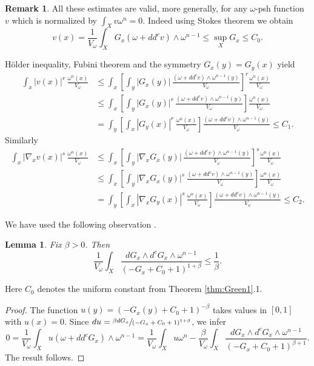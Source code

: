 \documentclass[10pt]{amsart}
\newtheorem{lem}[theorem]{Lemma}
\theoremstyle{definition}
\newtheorem{rem}[theorem]{Remark}
\begin{document}
\begin{rem}
All these estimates are valid, more generally, for any $\omega$-psh function~$v$ which is
normalized by $\int_X v \omega^n=0$. Indeed using Stokes theorem we obtain
\[
v(x) =\frac{1}{V_{\omega}} \int_X G_x (\omega+dd^c v) \wedge \omega^{n-1} \leq \sup_X G_x \leq C_0.
\]

Hölder inequality, Fubini theorem and the symmetry $G_x(y)=G_y(x)$ yield
\begin{align*}
\int_x |v(x)|^r \,\frac{\omega^n(x)}{V_{\omega}}
&\leq  \int_x \left[ \int_y |G_x(y)|\, \frac{(\omega+dd^c v) \wedge \omega^{n-1}(y)}{V_{\omega}} \right]^r \frac{\omega^n(x)}{V_{\omega}} \\
&\leq  \int_x \left[ \int_y |G_x(y)|^r\, \frac{(\omega+dd^c v) \wedge \omega^{n-1}(y)}{V_{\omega}} \right] \frac{\omega^n(x)}{V_{\omega}} \\
&= \int_y \left[ \int_x |G_y(x)|^r\, \frac{\omega^n(x)}{V_{\omega}} \right] \frac{(\omega+dd^c v) \wedge \omega^{n-1}(y)}{V_{\omega}} \leq C_1.
\end{align*}
Similarly
\begin{align*}
\int_x |\nabla_x v(x)|^s \,\frac{\omega^n(x)}{V_{\omega}}
&\leq  \int_x \left[ \int_y | \nabla_x G_x(y)|\, \frac{(\omega+dd^c v) \wedge \omega^{n-1}(y)}{V_{\omega}} \right]^s \frac{\omega^n(x)}{V_{\omega}} \\
&\leq  \int_x \left[ \int_y |\nabla_x G_x(y)|^s\, \frac{(\omega+dd^c v) \wedge \omega^{n-1}(y)}{V_{\omega}} \right] \frac{\omega^n(x)}{V_{\omega}} \\
&= \int_y \left[ \int_x |\nabla_x G_y(x)|^s\, \frac{\omega^n(x)}{V_{\omega}} \right] \frac{(\omega+dd^c v) \wedge \omega^{n-1}(y)}{V_{\omega}} \leq C_2.
\end{align*}
\end{rem}

We have used the following observation \cite[Lem.\,5.6]{GPSS22}.

\begin{lem} \label{lem:weightedgradient}
Fix $\beta>0$. Then
\[
\frac{1}{V_{\omega}} \int_X \frac{d G_x \wedge d^c G_x \wedge \omega^{n-1}}{(-G_x+C_0+1)^{1+\beta}} \leq \frac{1}{\beta}.
\]
\end{lem}

Here $C_0$ denotes the uniform constant from Theorem \ref{thm:Green1}.1.

\begin{proof}
The function $u(y)=(-G_x(y)+C_0+1)^{-\beta}$ takes values in $[0,1]$ with $u(x)=0$.
Since $du=\sfrac{\beta dG_x}{(-G_x+C_0+1)^{1+\beta}}$, we infer
\[
0=\frac{1}{V_{\omega}} \int_X u (\omega+dd^c G_x) \wedge \omega^{n-1}
=\frac{1}{V_{\omega}} \int_X u \omega^{n}
- \frac{\beta}{V_{\omega}} \int_X \frac{d G_x \wedge d^c G_x \wedge \omega^{n-1}}{(-G_x+C_0+1)^{\beta+1}}.
\]
The result follows.
\end{proof}
\end{document}
